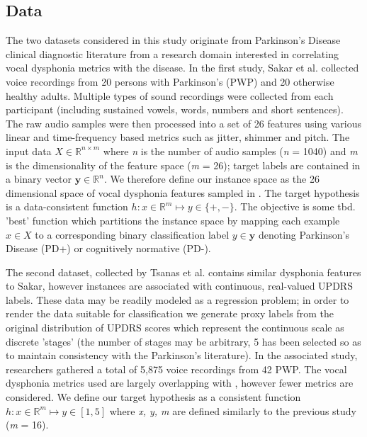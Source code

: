 \documentclass[12pt]{article}
\begin{document}
\subsection{Data}
The two datasets considered in this study originate from Parkinson's Disease clinical diagnostic literature from a research domain interested in correlating vocal dysphonia metrics with the disease. In the first study, Sakar et al.\cite{Sakar2013} collected voice recordings from 20 persons with Parkinson's (PWP) and 20 otherwise healthy adults. Multiple types of sound recordings were collected from each participant (including sustained vowels, words, numbers and short sentences). The raw audio samples were then processed into a set of 26 features using various linear and time-frequency based metrics such as jitter, shimmer and pitch. The input data $X \in \mathbb{R}^{n \times m} $ where \textit{n} is the number of audio samples (\textit{n} = 1040) and \textit{m} is the dimensionality of the feature space (\textit{m} = 26); target labels are contained in a binary vector $ \boldsymbol{y} \in \mathbb{R}^n $. We therefore define our instance space as the 26 dimensional space of vocal dysphonia features sampled in \cite{Sakar2013}. The target hypothesis is a data-consistent function $ h : x \in \mathbb{R}^m \mapsto y \in \lbrace +,- \rbrace $. The objective is some tbd. 'best' function which partitions the instance space by mapping each example $ x \in X $ to a corresponding binary classification label $ y \in \boldsymbol{y} $ denoting Parkinson's Disease (PD+) or cognitively normative (PD-).

The second dataset, collected by Tsanas et al.\cite{Tsanas2010} contains similar dysphonia features to Sakar, however instances are associated with continuous, real-valued UPDRS labels. These data may be readily modeled as a regression problem; in order to render the data suitable for classification we generate proxy labels from the original distribution of UPDRS scores which represent the continuous scale as discrete 'stages' (the number of stages may be arbitrary, 5 has been selected so as to maintain consistency with the Parkinson's literature). In the associated study, researchers gathered a total of 5,875 voice recordings from 42 PWP. The vocal dysphonia metrics used are largely overlapping with \cite{Sakar2013}, however fewer metrics are considered. We define our target hypothesis as a consistent function $ h : x \in \mathbb{R}^m \mapsto y \in [1,5] $ where \textit{x, y, m} are defined similarly to the previous study (\textit{m} = 16).
\end{document}
